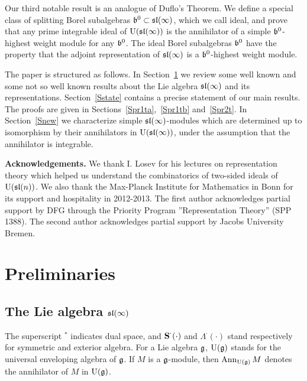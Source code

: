 \documentclass[10pt]{amsart}\oddsidemargin -1mm \evensidemargin -1mm \topmargin -15mm\headheight5mm \headsep 3.5mm \textheight 245mm\textwidth 170mm %
\theoremstyle{definition}\newtheorem{theorem}{Theorem}[section]\newtheorem{lemma}[theorem]{Lemma}\newtheorem{remark}[theorem]{Remark}\newtheorem{proposition}[theorem]{Proposition}\newtheorem{corollary}[theorem]{Corollary}\newtheorem{definition}[theorem]{Definition}\newtheorem{Ex}[theorem]{Example}
\begin{document}
Our third notable result is an analogue of Duflo's Theorem. We define a special class of splitting Borel subalgebras $\frak b^0\subset\frak{sl}(\infty)$, which we call ideal, and prove that any prime integrable ideal of $\operatorname{\mathrm{U}}(\frak{sl}(\infty))$ is the annihilator of a simple $\frak b^0$-highest weight module for any $\frak b^0$. The ideal Borel subalgebras $\frak b^0$ have the property that the adjoint representation of $\frak{sl}(\infty)$ is a $\frak b^0$-highest weight module.

The paper is structured as follows. In Section~\ref{Spre} we review some well known and some not so well known results about the Lie algebra $\frak{sl}(\infty)$ and its representations. Section~\ref{Sstate} contains a precise statement of our main results. %
The proofs are given in Sections~\ref{Spr1ta},~\ref{Spr1tb} and~\ref{Spr2t}. In Section~\ref{Snew} we characterize simple $\frak{sl}(\infty)$-modules which are determined up to isomorphism by their annihilators in $\operatorname{\mathrm{U}}(\frak{sl}(\infty))$, under the assumption that the annihilator is integrable. %

{\bf Acknowledgements.} We thank I. Losev for his lectures on representation theory which helped us understand the combinatorics of two-sided ideals of $\operatorname{\mathrm{U}}(\frak{sl}(n))$. We also thank the Max-Planck Institute for Mathematics in Bonn for its support and hospitality in 2012-2013. The first author acknowledges partial support by DFG through the Priority Program ''Representation Theory'' (SPP 1388). The second author acknowledges partial support by Jacobs University Bremen.

\section{Preliminaries}\label{Spre}%
\subsection{The Lie algebra $\frak{sl}(\infty)$}\label{SSslnot}The superscript $^*$ indicates dual space, and $\operatorname{\mathbf{S}}^\cdot(\cdot)$ and $\Lambda^\cdot(\cdot)$ stand respectively for symmetric and exterior algebra. For a Lie algebra $\frak g$, $\operatorname{\mathrm{U}}(\frak g)$ stands for the
universal enveloping algebra of $\frak g$. If $M$ is a $\frak g$-module, then $\operatorname{\mathrm{Ann}}_{\operatorname{\mathrm{U}}(\frak g)}M$ denotes the annihilator of $M$ in $\operatorname{\mathrm{U}}(\frak g)$.
\end{document}
